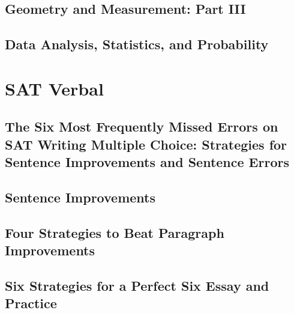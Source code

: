 \documentclass[12pt]{book}
\begin{document}
\chapter{Geometry and Measurement: Part III}
	
	

\chapter{Data Analysis, Statistics, and Probability}
	
	
	
	

\part{SAT Verbal}

\chapter{The Six Most Frequently Missed Errors on SAT Writing Multiple Choice: Strategies for Sentence Improvements and Sentence Errors}
	
	
	
	
	
	
	
	
	
	
	
	

\chapter{Sentence Improvements}
	
	
	
	
	

\chapter{Four Strategies to Beat Paragraph Improvements}
	
	
	
	
	
	

\chapter{Six Strategies for a Perfect Six Essay and Practice}
	
	
	
	
	
	
	
	
\end{document}
